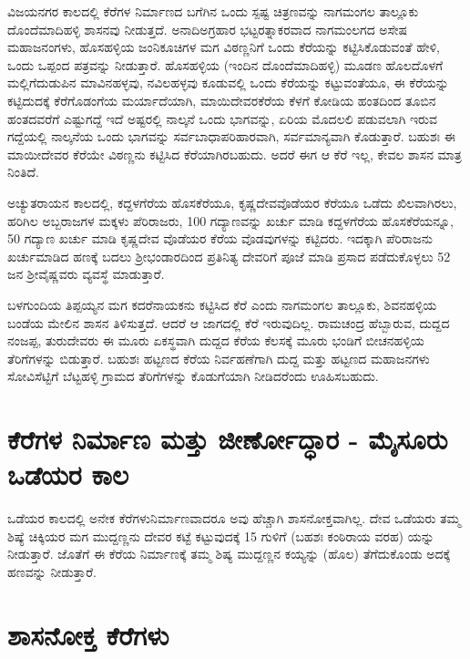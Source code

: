 ವಿಜಯನಗರ ಕಾಲದಲ್ಲಿ ಕೆರೆಗಳ ನಿರ್ಮಾಣದ ಬಗೆಗಿನ ಒಂದು ಸ್ಪಷ್ಟ ಚಿತ್ರಣವನ್ನು ನಾಗಮಂಗಲ ತಾಲ್ಲೂಕು ದೊಂದೆಮಾದಿಹಳ್ಳಿ ಶಾಸನವು ನೀಡುತ್ತದೆ. ಅನಾದಿಅಗ್ರಹಾರ ಭಟ್ಟರತ್ನಾಕರವಾದ ನಾಗಮಂಲಗದ ಅಸೇಷ ಮಹಾಜನಂಗಳು, ಹೊಸಹಳ್ಳಿಯ ಜಂನಿಕೂಚಿಗಳ ಮಗ ವಿಠಣ್ಣನಿಗೆ ಒಂದು ಕೆರೆಯನ್ನು ಕಟ್ಟಿಸಿಕೊಡುವಂತೆ ಹೇಳಿ, ಒಂದು ಒಪ್ಪಂದ ಪತ್ರವನ್ನು ನೀಡುತ್ತಾರೆ. ಹೊಸಹಳ್ಳಿಯ (ಇಂದಿನ ದೊಂದೆಮಾದಿಹಳ್ಳಿ) ಮೂಡಣ ಹೊಲದೊಳಗೆ ಮಲ್ಲಿಗೆದುಡುಪಿನ ಮಾವಿನಹಳ್ಳವು, ನವಿಲಹಳ್ಳವು ಕೂಡುವಲ್ಲಿ ಒಂದು ಕೆರೆಯನ್ನು ಕಟ್ಟುವಂತೆಯೂ, ಈ ಕೆರೆಯನ್ನು ಕಟ್ಟಿದುದಕ್ಕೆ ಕೆರೆಗೊಡಂಗೆಯ ಮರ್ಯಾದೆಯಾಗಿ, ಮಾಯಿದೇವರಕೆರೆಯ ಕೆಳಗೆ ಕೋಡಿಯ ಹಂತದಿಂದ ತೂಬಿನ ಹಂತದವರೆಗೆ ಎಷ್ಟುಗದ್ದೆ ಇದೆ ಅಷ್ಟರಲ್ಲಿ ನಾಲ್ಕನೆ ಒಂದು ಭಾಗವನ್ನು, ಏರಿಯ ಮೊದಲಲಿ ಪಡುವಲಾಗಿ ಇರುವ ಗದ್ದೆಯಲ್ಲಿ ನಾಲ್ಕನೆಯ ಒಂದು ಭಾಗವನ್ನು ಸರ್ವಬಾಧಾಪರಿಹಾರವಾಗಿ, ಸರ್ವಮಾನ್ಯವಾಗಿ ಕೊಡುತ್ತಾರೆ. ಬಹುಶಃ ಈ ಮಾಯೀದೇವರ ಕೆರೆಯೇ ವಿಠಣ್ಣನು ಕಟ್ಟಿಸಿದ ಕೆರೆಯಾಗಿರಬಹುದು. ಅದರೆ ಈಗ ಆ ಕೆರೆ ಇಲ್ಲ, ಕೇವಲ ಶಾಸನ ಮಾತ್ರ ನಿಂತಿದೆ.

ಅಚ್ಯುತರಾಯನ ಕಾಲದಲ್ಲಿ, ಕದ್ದಳಗೆರೆಯ ಹೊಸಕೆರೆಯೂ, ಕೃಷ್ಣದೇವವೊಡೆಯರ ಕೆರೆಯೂ ಒಡೆದು ಖಿಲವಾಗಿ\-ರಲು, ಹರಿಗಿಲ ಅಬ್ಬರಾಜಗಳ ಮಕ್ಕಳು ಪೆರಿರಾಜರು, 100 ಗದ್ಯಾಣವನ್ನು ಖರ್ಚು ಮಾಡಿ ಕದ್ದಳಗೆರೆಯ ಹೊಸಕೆರೆಯನ್ನೂ, 50 ಗದ್ಯಾಣ ಖರ್ಚು ಮಾಡಿ ಕೃಷ್ಣದೇವ ವೊಡೆಯರ ಕೆರೆಯ ವೊಡವುಗಳನ್ನು ಕಟ್ಟಿದರು. ಇದಕ್ಕಾಗಿ ಪೆರಿರಾಜನು ಖರ್ಚುಮಾಡಿದ ಹಣಕ್ಕೆ ಬದಲು ಶ‍್ರೀಭಂಡಾರದಿಂದ ಪ್ರತಿನಿತ್ಯ ದೇವರಿಗೆ ಪೂಜೆ ಮಾಡಿ ಪ್ರಸಾದ ಪಡೆದುಕೊಳ್ಳಲು 52 ಜನ ಶ‍್ರೀವೈಷ್ಣವರು ವ್ಯವಸ್ಥೆ ಮಾಡುತ್ತಾರೆ.

ಬಳಗುಂದಿಯ ತಿಪ್ಪಯ್ಯನ ಮಗ ಕದರೆನಾಯಕನು ಕಟ್ಟಿಸಿದ ಕೆರೆ ಎಂದು ನಾಗಮಂಗಲ ತಾಲ್ಲೂಕು, ಶಿವನಹಳ್ಳಿಯ ಬಂಡೆಯ ಮೇಲಿನ ಶಾಸನ ತಿಳಿಸುತ್ತದೆ. ಆದರೆ ಆ ಜಾಗದಲ್ಲಿ ಕೆರೆ ಇರುವುದಿಲ್ಲ. ರಾಮಚಂದ್ರ ಹೆಬ್ಬಾರುವ, ದುದ್ದದ ನಂಜಪ್ಪ, ತುರುದೇವರು ಈ ಮೂರು ಏಕಸ್ಥವಾಗಿ ದುದ್ದದ ಕೆರೆಯ ಕೆಲಸಕ್ಕೆ ಮೂರು ಭಂಡಿಗೆ ಬೀಚನಹಳ್ಳಿಯ ತೆರಿಗೆಗಳನ್ನು ಬಿಡುತ್ತಾರೆ. ಬಹುಶಃ ಹಟ್ಟಣದ ಕೆರೆಯ ನಿರ್ವಹಣೆಗಾಗಿ ದುದ್ದ ಮತ್ತು ಹಟ್ಟಣದ ಮಹಾಜನಗಳು ಸೋವಿಸೆಟ್ಟಿಗೆ ಬೆಟ್ಟಹಳ್ಳಿ ಗ್ರಾಮದ ತೆರಿಗೆಗಳನ್ನು ಕೊಡುಗೆಯಾಗಿ ನೀಡಿದರೆಂದು ಊಹಿಸಬಹುದು.


\section{ಕೆರೆಗಳ ನಿರ್ಮಾಣ ಮತ್ತು ಜೀರ್ಣೋದ್ಧಾರ - ಮೈಸೂರು ಒಡೆಯರ ಕಾಲ}

ಒಡೆಯರ ಕಾಲದಲ್ಲಿ ಅನೇಕ ಕೆರೆಗಳುನಿರ್ಮಾಣವಾದರೂ ಅವು ಹೆಚ್ಚಾಗಿ ಶಾಸನೋಕ್ತವಾಗಿಲ್ಲ. ದೇವ ಒಡೆಯರು ತಮ್ಮ ಶಿಷ್ಯೆ ಚಿಕ್ಕಿಯರ ಮಗ ಮುದ್ದಣ್ಣನು ದೇವರ ಕಟ್ಟೆ ಕಟ್ಟುವುದಕ್ಕೆ 15 ಗುಳಿಗೆ (ಬಹಶಃ ಕಂಠಿರಾಯ ವರಹ) ಯನ್ನು ನೀಡುತ್ತಾರೆ. ಜೊತೆಗೆ ಈ ಕೆರೆಯ ನಿರ್ಮಾಣಕ್ಕೆ ತಮ್ಮ ಶಿಷ್ಯ ಮುದ್ದಣ್ಣನ ಕಯ್ಯನ್ನು (ಹೊಲ) ತೆಗೆದುಕೊಂಡು ಅದಕ್ಕೆ ಹಣವನ್ನು ನೀಡುತ್ತಾರೆ.


\section{ಶಾಸನೋಕ್ತ ಕೆರೆಗಳು}

